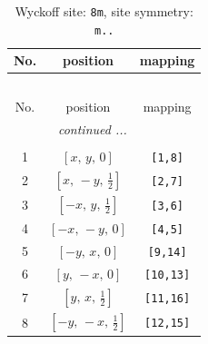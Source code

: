 \documentclass[fleqn,8pt]{jsarticle}
\begin{document}
\begin{longtable}{ccc}
\caption{Wyckoff site: {\tt 8m}, site symmetry: {\tt m..}}
 \\
 \hline \hline
No. & position & mapping \\ \hline \endfirsthead

\multicolumn{2}{l}{\tablename\ \thetable{}} \\
 \hline \hline
No. & position & mapping \\ \hline \endhead

 \hline \hline
\multicolumn{2}{r}{\footnotesize\it continued ...} \\ \endfoot

 \hline \hline
\multicolumn{2}{r}{} \\ \endlastfoot

1 & $\left[ x,\, y,\, 0 \right]$ & {\tt [1,8]} \\ \hline
2 & $\left[ x,\, - y,\, \frac{1}{2} \right]$ & {\tt [2,7]} \\ \hline
3 & $\left[ - x,\, y,\, \frac{1}{2} \right]$ & {\tt [3,6]} \\ \hline
4 & $\left[ - x,\, - y,\, 0 \right]$ & {\tt [4,5]} \\ \hline
5 & $\left[ - y,\, x,\, 0 \right]$ & {\tt [9,14]} \\ \hline
6 & $\left[ y,\, - x,\, 0 \right]$ & {\tt [10,13]} \\ \hline
7 & $\left[ y,\, x,\, \frac{1}{2} \right]$ & {\tt [11,16]} \\ \hline
8 & $\left[ - y,\, - x,\, \frac{1}{2} \right]$ & {\tt [12,15]} \\
\end{longtable}
\renewcommand{\arraystretch}{1.2}
\end{document}
